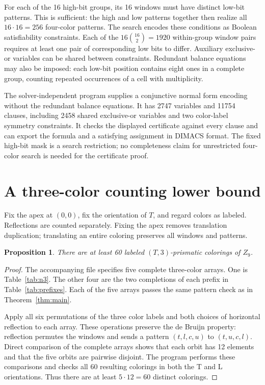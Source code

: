 \documentclass[11pt]{article}
\newtheorem{proposition}{Proposition}
\begin{document}
For each of the 16 high-bit groups, its 16 windows must have distinct
low-bit patterns. This is sufficient: the high and low patterns together
then realize all $16\cdot16=256$ four-color patterns. The search encodes
these conditions as Boolean satisfiability constraints. Each of the
$16\binom{16}{2}=1920$ within-group window pairs requires at least one
pair of corresponding low bits to differ. Auxiliary exclusive-or
variables can be shared between constraints. Redundant balance equations
may also be imposed: each low-bit position contains eight ones in a
complete group, counting repeated occurrences of a cell with multiplicity.

The solver-independent program  supplies a
conjunctive normal form encoding without the redundant balance equations.
It has 2747 variables and 11754 clauses, including 2458 shared
exclusive-or variables and two color-label symmetry constraints.
It checks the displayed certificate against every clause and can export
the formula and a satisfying assignment in DIMACS format. The fixed
high-bit mask is a search restriction; no completeness claim for
unrestricted four-color search is needed for the certificate proof.

\section{A three-color counting lower bound}
Fix the apex at $(0,0)$, fix the orientation of $T$, and regard colors
as labeled. Reflections are counted separately. Fixing the apex removes
translation duplication; translating an entire coloring preserves all
windows and patterns.

\begin{proposition}\label{prop:count}
There are at least 60 labeled $(T,3)$-prismatic colorings of $Z_9$.
\end{proposition}
\begin{proof}
The accompanying file  specifies five complete
three-color arrays. One is Table~\ref{tab:n3}. The other four are the
two completions of each prefix in Table~\ref{tab:prefixes}.
Each of the five arrays passes the same pattern check as in
Theorem~\ref{thm:main}.

Apply all six permutations of the three color labels and both choices
of horizontal reflection to each array. These operations preserve the
de Bruijn property: reflection permutes the windows and sends a pattern
$(t,l,c,u)$ to $(t,u,c,l)$. Direct comparison of the complete arrays
shows that each orbit has 12 elements and that the five orbits are
pairwise disjoint. The program  performs these comparisons
and checks all 60 resulting colorings in both the T and L orientations.
Thus there are at least $5\cdot12=60$ distinct colorings.
\end{proof}
\end{document}

